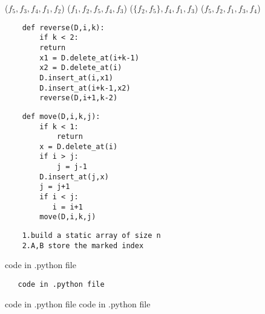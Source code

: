 \documentclass[12pt,twoside]{article}
\begin{document}


\begin{problems}

\problem  %

\begin{problemparts}
\problempart %
(\(f_5,f_3,f_4,f_1,f_2\))
\problempart %
(\(f_1,f_2,f_5,f_4,f_3\))
\problempart %
(\(\{f_2,f_5\},f_4,f_1,f_3\))
\problempart %
(\(f_5,f_2,f_1,f_3,f_4\))
\end{problemparts}

\newpage
\problem  %

\begin{problemparts}
\problempart %
\begin{verbatim}
    def reverse(D,i,k):
        if k < 2:
        return
        x1 = D.delete_at(i+k-1)
        x2 = D.delete_at(i)
        D.insert_at(i,x1)
        D.insert_at(i+k-1,x2)
        reverse(D,i+1,k-2)
    \end{verbatim}
\problempart %
\begin{verbatim}
    def move(D,i,k,j):
        if k < 1:
            return
        x = D.delete_at(i)
        if i > j:
            j = j-1
        D.insert_at(j,x)
        j = j+1
        if i < j:
           i = i+1
        move(D,i,k,j)

\end{verbatim}
\end{problemparts}

\newpage
\problem  %
\begin{verbatim}
    1.build a static array of size n
    2.A,B store the marked index
\end{verbatim}
\newpage
\problem  %

\begin{problemparts}
\problempart %
code in .python file
\problempart %
\begin{verbatim}
   code in .python file
\end{verbatim}
\problempart %
code in .python file
\problempart %
code in .python file
\end{problemparts}

\end{problems}
\end{document}
